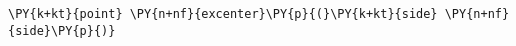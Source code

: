 \begin{Verbatim}[commandchars=\\\{\}]
    \PY{k+kt}{point} \PY{n+nf}{excenter}\PY{p}{(}\PY{k+kt}{side} \PY{n+nf}{side}\PY{p}{)}
\end{Verbatim}
